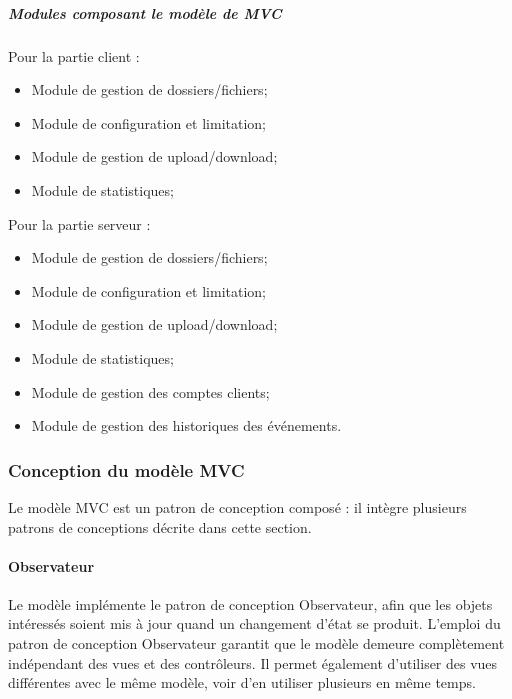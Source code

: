 \documentclass[10pt,a4paper]{report}
\begin{document}
			\subparagraph{Modules composant le modèle de MVC}
			\begin{flushleft}
			Pour la partie client :
				\begin{itemize}
					\item Module de gestion de dossiers/fichiers;
					\item Module de configuration et limitation;
					\item Module de gestion de upload/download;
					\item Module de statistiques;
				\end{itemize}
			Pour la partie serveur :
			\begin{itemize}
					\item Module de gestion de dossiers/fichiers;
					\item Module de configuration et limitation;
					\item Module de gestion de upload/download;
					\item Module de statistiques;
					\item Module de gestion des comptes clients;
					\item Module de gestion des historiques des événements.
				\end{itemize}
			\end{flushleft}

			
		\subsubsection{Conception du modèle MVC}
		
		Le modèle MVC est un patron de conception composé : il intègre plusieurs patrons de conceptions décrite dans cette section.
		
		\paragraph{Observateur}
		\begin{flushleft}
		Le modèle implémente le patron de conception Observateur, afin que les objets intéressés soient mis à jour quand un changement d’état se produit. L’emploi du patron de conception Observateur garantit que le modèle demeure complètement indépendant des vues et des contrôleurs. Il permet également d’utiliser des vues différentes avec le même modèle, voir d’en utiliser plusieurs en même temps.

		\end{flushleft}
\end{document}
